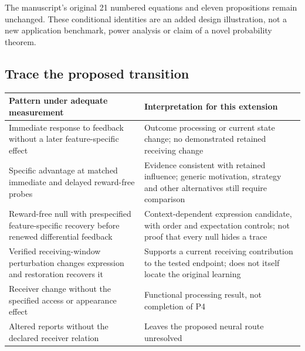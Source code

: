 \documentclass[
  american,
  11pt,
  letterpaper,
]{article}
\newcounter{none} %
\begin{document}
The manuscript's original 21 numbered equations and eleven propositions remain unchanged. These conditional identities are an added design illustration, not a new application benchmark, power analysis or claim of a novel probability theorem.

\subsection{Trace the proposed transition}\label{trace-the-proposed-transition}

{\def\LTcaptype{none} %
\begin{longtable}[]{@{}
  >{\raggedright\arraybackslash}p{}
  >{\raggedright\arraybackslash}p{}@{}}
\toprule\noalign{}
\begin{minipage}[b]{\linewidth}\raggedright
Pattern under adequate measurement
\end{minipage} & \begin{minipage}[b]{\linewidth}\raggedright
Interpretation for this extension
\end{minipage} \\
\midrule\noalign{}
\endhead
\bottomrule\noalign{}
\endlastfoot
Immediate response to feedback without a later feature-specific effect & Outcome processing or current state change; no demonstrated retained receiving change \\
Specific advantage at matched immediate and delayed reward-free probes & Evidence consistent with retained influence; generic motivation, strategy and other alternatives still require comparison \\
Reward-free null with prespecified feature-specific recovery before renewed differential feedback & Context-dependent expression candidate, with order and expectation controls; not proof that every null hides a trace \\
Verified receiving-window perturbation changes expression and restoration recovers it & Supports a current receiving contribution to the tested endpoint; does not itself locate the original learning \\
Receiver change without the specified access or appearance effect & Functional processing result, not completion of P4 \\
Altered reports without the declared receiver relation & Leaves the proposed neural route unresolved \\
\end{longtable}
}
\end{document}
